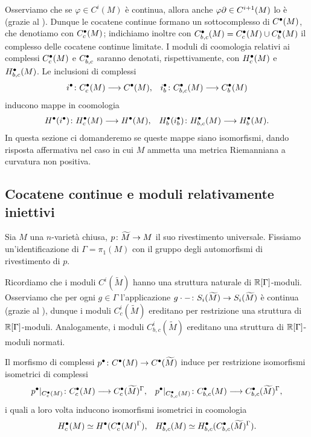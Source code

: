Osserviamo che se $\varphi\in C^i(M)$ è continua, allora anche $\varphi\partial\in C^{i+1}(M)$ lo è (grazie al ). Dunque le cocatene continue formano un sottocomplesso di $C^\bullet(M)$, che denotiamo con $C^\bullet_c(M)$; indichiamo inoltre con $C^\bullet_{b,c}(M)=C^\bullet_c(M)\cup C^\bullet_b(M)$ il complesso delle cocatene continue limitate. I moduli di coomologia relativi ai complessi $C^\bullet_c(M)$ e $C^\bullet_{b,c}$ saranno denotati, rispettivamente, con $H^\bullet_c(M)$ e $H^\bullet_{b,c}(M)$. Le inclusioni di complessi
\begin{align*}
\map{i^\bul}{C^\bul_c(M)}{C^\bul(M)},&&\map{i^\bul_b}{C^\bul_{b,c}(M)}{C^\bul_b(M)}
\end{align*}
inducono mappe in coomologia
\begin{align*}
\map{H^\bul(i^\bul)}{H^\bul_c(M)}{H^\bul(M)},&&\map{H^\bul_b(i^\bul_b)}{H^\bul_{b,c}(M)}{H^\bul_b(M)}.
\end{align*}
In questa sezione ci domanderemo se queste mappe siano isomorfismi, dando risposta affermativa nel caso in cui $M$ ammetta una metrica Riemanniana a curvatura non positiva.


\subsection{Cocatene continue e moduli relativamente iniettivi}

Sia $M$ una $n$-varietà chiusa, $\map{p}{\widetilde M}{M}$ il suo rivestimento universale. Fissiamo un'identificazione di $\Gamma=\pi_1(M)$ con il gruppo degli automorfismi di rivestimento di $p$.

Ricordiamo che i moduli $C^i(\widetilde M)$ hanno una struttura naturale di $\mathbb{R}[\Gamma]$-moduli. Osserviamo che per ogni $g\in\Gamma$ l'applicazione $\map{g\cdot{-}}{S_i(\widetilde M)}{S_i(\widetilde M)}$ è continua (grazie al ), dunque i moduli $C^i_c(\widetilde M)$ ereditano per restrizione una struttura di $\mathbb{R}[\Gamma]$-moduli. Analogamente, i moduli $C^i_{b,c}(\widetilde M)$ ereditano una struttura di $\mathbb{R}[\Gamma]$-moduli normati.

\begin{lemma}
Il morfismo di complessi $\map{p^\bul}{C^\bul(M)}{C^\bul(\widetilde M)}$ induce per restrizione isomorfismi  isometrici di complessi
\begin{align*}
\map{p^\bul|_{C^\bul_c(M)}}{C^\bul_c(M)}{C^\bul_c(\widetilde M)^\Gamma},&&\map{p^\bul|_{C^\bul_{b,c}(M)}}{C^\bul_{b,c}(M)}{C^\bul_{b,c}(\widetilde M)^\Gamma},
\end{align*}
i quali a loro volta inducono isomorfismi isometrici in coomologia
\begin{align*}
H^\bullet_c(M)\simeq H^\bullet(C^\bullet_c(M)^\Gamma),&&H^\bullet_{b,c}(M)\simeq H^\bullet_{b,c}(C^\bullet_{b,c}(\widetilde M)^\Gamma).
\end{align*}
\end{lemma}

